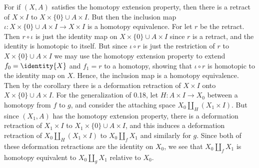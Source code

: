\documentclass{book}                                                           %
\begin{document}
\begin{solution}
    For if $(X,A)$ satisfies the homotopy extension property, then there is
    a retract of $X\times{I}$ to $X\times\{0\}\cup{A}\times{I}$. But then
    the inclusion map
    $\iota:X\times\{0\}\cup{A}\times{I}\rightarrow{X}\times{I}$ is a
    homotopy equivalence. For let $r$ be the retract. Then
    $r\circ\iota$ is just the identity map on $X\times\{0\}\cup{A}\times{I}$
    since $r$ is a retract, and the identity is homotopic to itself. But
    since $\iota\circ{r}$ is just the restriction of $r$ to
    $X\times\{0\}\cup{A}\times{I}$ we may use the homotopy extension
    property to extend $f_{0}=\identity{X}$ and $f_{1}=r$ to a homotopy,
    showing that $\iota\circ{r}$ is homotopic to the identity map on $X$.
    Hence, the inclusion map is a homotopy equivalence. Then by the
    corollary there is a deformation retraction of $X\times{I}$ onto
    $X\times\{0\}\cup{A}\times{I}$. For the generalization of 0.18, let
    $H:A\times{I}\rightarrow{X}_{0}$ between a homotopy from $f$ to $g$, and
    consider the attaching space $X_{0}\coprod_{H}(X_{1}\times{I})$. But
    since $(X_{1},A)$ has the homotopy extension property, there is a
    deformation retraction of $X_{1}\times{I}$ to
    $X_{1}\times\{0\}\cup{A}\times{I}$, and this induces a deformation
    retraction of $X_{0}\coprod_{H}(X_{1}\times{I})$ to
    $X_{0}\coprod_{f}X_{1}$ and similarly for $g$. Since both of these
    deformation retractions are the identity on $X_{0}$, we see that
    $X_{0}\coprod_{f}X_{1}$ is homotopy equivalent to
    $X_{0}\coprod_{g}X_{1}$ relative to $X_{0}$.
\end{solution}
\end{document}
